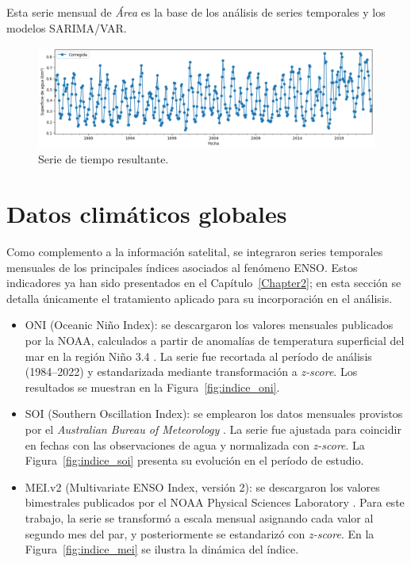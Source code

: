 Esta serie mensual de \emph{Área} es la base de los análisis de series temporales y los modelos SARIMA/VAR.

\begin{figure}[ht]
        \centering
        \includegraphics[scale=.45]
        {Figures/ts_final_cnn.png}
        \caption{Serie de tiempo resultante.}
        \label{fig:ts_cnn}
\end{figure}


\section{Datos climáticos globales}

Como complemento a la información satelital, se integraron series temporales mensuales de los principales índices asociados al fenómeno ENSO. Estos indicadores ya han sido presentados en el Capítulo~\ref{Chapter2}; en esta sección se detalla únicamente el tratamiento aplicado para su incorporación en el análisis.

\begin{itemize}
    \item ONI (Oceanic Niño Index): se descargaron los valores mensuales publicados por la NOAA, calculados a partir de anomalías de temperatura superficial del mar en la región Niño 3.4 \parencite{noaaONI}. La serie fue recortada al período de análisis (1984--2022) y estandarizada mediante transformación a \textit{z-score}. Los resultados se muestran en la Figura~\ref{fig:indice_oni}.
    
    \item SOI (Southern Oscillation Index): se emplearon los datos mensuales provistos por el \textit{Australian Bureau of Meteorology} \parencite{bom_soi_2024}. La serie fue ajustada para coincidir en fechas con las observaciones de agua y normalizada con \textit{z-score}. La Figura~\ref{fig:indice_soi} presenta su evolución en el período de estudio.
    
    \item MEI.v2 (Multivariate ENSO Index, versión 2): se descargaron los valores bimestrales publicados por el NOAA Physical Sciences Laboratory \parencite{meiindex}. Para este trabajo, la serie se transformó a escala mensual asignando cada valor al segundo mes del par, y posteriormente se estandarizó con \textit{z-score}. En la Figura~\ref{fig:indice_mei} se ilustra la dinámica del índice.
\end{itemize}

